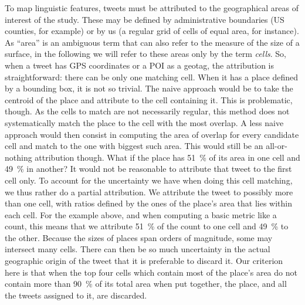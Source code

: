\documentclass[../thesis.tex]{subfiles}
\begin{document}
To map linguistic features, tweets must be attributed to the geographical areas of
interest of the study. These may be defined by administrative boundaries (US counties,
for example) or by us (a regular grid of cells of equal area, for instance). As ``area''
is an ambiguous term that can also refer to the measure of the size of a surface, in the
following we will refer to these areas only by the term \emph{cells}. So, when a tweet
has GPS coordinates or a \ac{POI} as a geotag, the attribution is straightforward: there
can be only one matching cell. When it has a place defined by a bounding box, it is not
so trivial. The naive approach would be to take the centroid of the place and attribute
to the cell containing it. This is problematic, though. As the cells to match are not
necessarily regular, this method does not systematically match the place to the cell
with the most overlap. A less naive approach would then consist in computing the area of
overlap for every candidate cell and match to the one with biggest such area. This would
still be an all-or-nothing attribution though. What if the place has \SI{51}{\percent}
of its area in one cell and \SI{49}{\percent} in another? It would not be reasonable to
attribute that tweet to the first cell only. To account for the uncertainty we have when
doing this cell matching, we thus rather do a partial attribution. We attribute the
tweet to possibly more than one cell, with ratios defined by the ones of the place's
area that lies within each cell. For the example above, and when computing a basic
metric like a count, this means that we attribute \SI{51}{\percent} of the count to one
cell and \SI{49}{\percent} to the other. Because the sizes of places span orders of
magnitude, some may intersect many cells. There can then be so much uncertainty in the
actual geographic origin of the tweet that it is preferable to discard it. Our criterion
here is that when the top four cells which contain most of the place's area do
not contain more than \SI{90}{\percent} of its total area when put together, the place, and all the tweets
assigned to it, are discarded.
\end{document}
